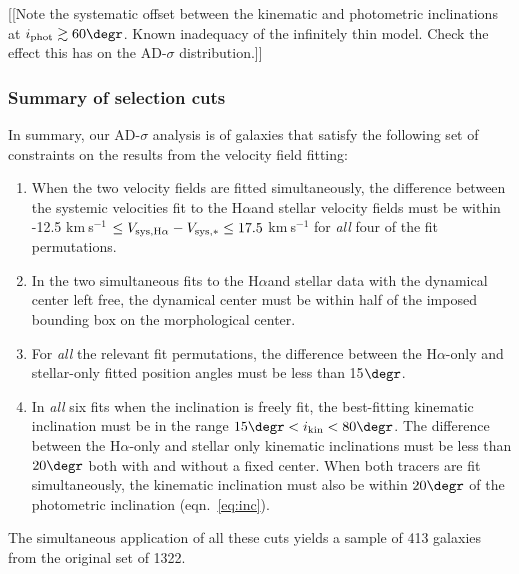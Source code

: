 \documentclass[apj,iop,revtex4,numberedappendix]{emulateapj}
\newcommand{\kms}{{km$~\!$s$^{-1}$}}
\newcommand{\halpha}{H$\alpha$}
\begin{document}
[[Note the systematic offset between the kinematic and photometric
inclinations at $i_{\rm phot} \gtrsim 60\degr$.  Known inadequacy of the
infinitely thin model.  Check the effect this has on the AD-$\sigma$
distribution.]]

\subsubsection{Summary of selection cuts}
\label{sec:kingeomcuts}

In summary, our AD-$\sigma$ analysis is of galaxies that satisfy the
following set of constraints on the results from the velocity field
fitting:
%
\begin{enumerate}
%
\item When the two velocity fields are fitted simultaneously, the
difference between the systemic velocities fit to the \halpha and stellar
velocity fields must be within -12.5 \kms{} $\leq V_{{\rm
sys,H}\alpha}-V_{{\rm sys},\ast} \leq 17.5$ \kms{} for {\em all} four of
the fit permutations.
%
\item In the two simultaneous fits to the \halpha and stellar data with
the dynamical center left free, the dynamical center must be within half
of the imposed bounding box on the morphological center.
%
\item For {\em all} the relevant fit permutations, the difference
between the \halpha-only and stellar-only fitted position angles must be
less than 15$\degr$.
%
\item In {\em all} six fits when the inclination is freely fit, the
best-fitting kinematic inclination must be in the range $15\degr <
i_{\rm kin} < 80\degr$.  The difference between the \halpha-only and
stellar only kinematic inclinations must be less than $20\degr$ both
with and without a fixed center.  When both tracers are fit
simultaneously, the kinematic inclination must also be within $20\degr$
of the photometric inclination (eqn.~\ref{eq:inc}).
%
\end{enumerate}
%
The simultaneous application of all these cuts yields a sample of 413
galaxies from the original set of 1322.

\end{document}

